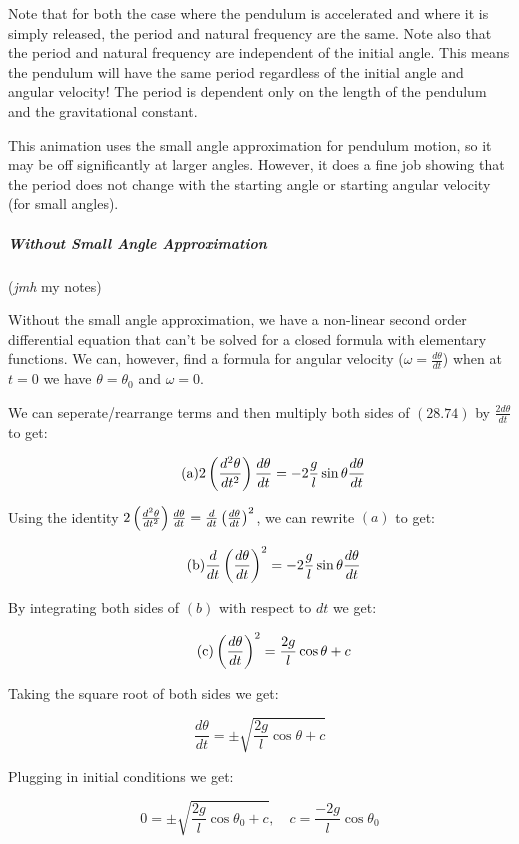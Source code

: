 \documentclass{article}
\begin{document}
Note that for both the case where the pendulum is accelerated and where it is simply released, the period and natural frequency are the same. Note also that the period and natural frequency are independent of the initial angle. This means the pendulum will have the same period regardless of the initial angle and angular velocity! The period is dependent only on the length of the pendulum and the gravitational constant.


This animation uses the small angle approximation for pendulum motion, so it may be off significantly at larger angles. However, it does a fine job showing that the period does not change with the starting angle or starting angular velocity (for small angles).

\subparagraph{Without Small Angle Approximation}

(\emph{jmh} my notes)

Without the small angle approximation, we have a non-linear second order differential equation that can't be solved for a closed formula with elementary functions. We can, however, find a formula for angular velocity ($\omega = \frac{d\theta}{dt}$) when at $t = 0$ we have $\theta = \theta_0$ and $\omega = 0$.

We can seperate/rearrange terms and then multiply both sides of $(28.74)$ by $\frac{2d\theta}{dt}$ to get:

\[ \tag{a} 2 \left(\frac{d^2 \theta}{dt^2}\right) \frac{d \theta}{dt} = -2\frac{g}{l}\sin{\theta} \frac{d\theta}{dt} \]

Using the identity $2 \left(\frac{d^2 \theta}{dt^2}\right) \frac{d \theta}{dt} = \frac{d}{dt} \left(\frac{d\theta}{dt}\right)^2$, we can rewrite $(a)$ to get:

\[ \tag{b} \frac{d}{dt} \left(\frac{d\theta}{dt}\right)^2  = -2\frac{g}{l}\sin{\theta} \frac{d\theta}{dt} \]

By integrating both sides of $(b)$ with respect to $dt$ we get:

\[ \tag{c} \left(\frac{d\theta}{dt}\right)^2 = \frac{2g}{l} \cos{\theta} + c \]

Taking the square root of both sides we get:

\[ \tag{d} \frac{d\theta}{dt} = \pm \sqrt{\frac{2g}{l}\cos{\theta}  + c } \]

Plugging in initial conditions we get:

\[ \tag{e} 0 = \pm \sqrt{\frac{2g}{l}\cos{\theta_0}  + c }, \quad c = \frac{-2g}{l}\cos{\theta_0} \]
\end{document}
